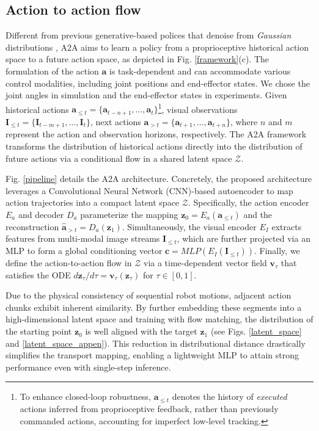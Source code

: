 \documentclass[onecolumn]{fairmeta}
\newcommand{\m}[1]{{A2A}}
\begin{document}
	\subsection{Action to action flow}
	Different from previous generative-based polices that denoise from \textit{Gaussian} distributions \citep{ddpm, flowmatching, dp}, \m{} aims to learn a policy from a proprioceptive historical action space to a future action space, as depicted in Fig. \ref{framework}(c). The formulation of the action $\mathbf{a}$ is task-dependent and can accommodate various control modalities, including joint positions and end-effector states. We chose the joint angles in simulation and the end-effector states in experiments. Given historical actions $\mathbf{a}_{\leq t} = \{\mathbf{a}_{t-n+1}, \dots, \mathbf{a}_t\}$\footnote{To enhance closed-loop robustness, $\mathbf{a}_{\leq t}$ denotes the history of {\textit{executed}} actions inferred from proprioceptive feedback, rather than previously commanded actions, accounting for imperfect low-level tracking.}, visual observations $\mathbf{I}_{\leq t}= \{\mathbf{I}_{t-m+1}, \dots, \mathbf{I}_t\}$, next actions $\mathbf{a}_{> t} = \{\mathbf{a}_{t+1}, \dots, \mathbf{a}_{t+n}\}$, where $n$ and $m$ represent the action and observation horizons, respectively. The \m{} framework transforms the distribution of historical actions directly into the distribution of future actions via a conditional flow in a shared latent space $\mathcal{Z}$.
	
	Fig. \ref{pipeline} details the \m{} architecture. Concretely, the proposed architecture leverages a Convolutional Neural Network (CNN)-based autoencoder to map action trajectories into a compact latent space $\mathcal{Z}$. Specifically, the action encoder $E_a$ and decoder $D_a$ parameterize the mapping $\mathbf{z}_0 = E_a(\mathbf{a}_{\leq t})$ and the reconstruction $\hat{\mathbf{a}}_{>t} = D_a(\mathbf{z}_1)$. Simultaneously, the visual encoder $E_I$ extracts features from multi-modal image streams $\mathbf{I}_{\leq t}$, which are further projected via an MLP to form a global conditioning vector $\mathbf{c} = {MLP}(E_I(\mathbf{I}_{\leq t}))$. Finally, we define the action-to-action flow in $\mathcal{Z}$ via a time-dependent vector field $\mathbf{v}_\tau$ that satisfies the ODE ${d\mathbf{z}_\tau}/{d\tau} = \mathbf{v}_\tau(\mathbf{z}_\tau)$ for $\tau \in [0, 1]$.
	
	Due to the physical consistency of sequential robot motions, adjacent action chunks exhibit inherent similarity. By further embedding these segments into a high-dimensional latent space and training with flow matching, the distribution of the starting point $\mathbf{z}_0$ is well aligned with the target $\mathbf{z}_1$ (see Figs. \ref{latent_space} and \ref{latent_space_appen}). This reduction in distributional distance drastically simplifies the transport mapping, enabling a lightweight MLP to attain strong performance even with single-step inference.
	
\end{document}
